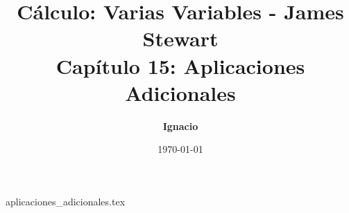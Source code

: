 \documentclass[11pt,spanish,oneside]{report}
\title{\textbf{Cálculo: Varias Variables - James Stewart} \\ \Large Capítulo 15: Aplicaciones Adicionales}
\author{\textbf{Ignacio}}
\date{\today}
\begin{document}
\maketitle

{aplicaciones_adicionales.tex}
\end{document}
